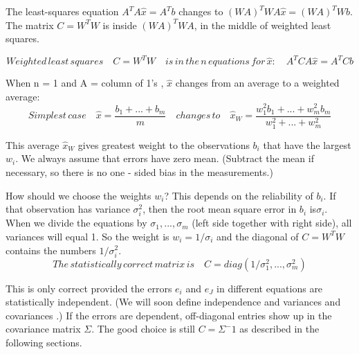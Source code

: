 	The least-squares equation $A^TA\hat{x}=A^Tb$ changes to $(WA)^TWA\hat{x}=(WA)^TWb$.
	The matrix $C=W^TW$ is inside $(WA)^TWA$, in the middle of weighted least squares.
	
	\begin{equation}
	Weighted \,least \,squares\quad 
	C=W^TW \quad is \,in \,the\, n\, equations\, for\, \hat{x}:   \quad A^TCA\hat{x}=A^TCb
	\end{equation}
	
	When n = 1 and A = column of 1's , $\hat{x}$ changes from an average to a weighted average: 
	\begin{equation}
	Simplest \,case 
	\quad \hat{x}=\frac{b_1+...+b_m}{m}
	\quad changes\,to 
	\quad \hat{x}_W=\frac{w^2_1b_1+...+w^2_mb_m}{w^2_1+...+w^2_m}
	\end{equation} 
	
	This average $\hat{x}_W$ gives greatest weight to the observations $b_i$ that have the largest $w_i$. We always assume that errors have zero mean. (Subtract the mean if necessary, so there is no one - sided bias in the measurements.)
	 
	How should we choose the weights $w_i$? This depends on the reliability of $b_i$. If that
	observation has variance $\sigma^2_i$, then the root mean square error in $b_i$ is$\sigma_i$. When we divide the equations by $\sigma_1,...,\sigma_m$ (left side together with right side), all variances will equal 1. So the weight is $w_i=1/\sigma_i$ and the diagonal of $C=W^TW$ contains the numbers $1/\sigma^2_i$.
	\begin{equation*}
	The\, statistically\, correct\, matrix\, is\quad  C=diag(1/\sigma^2_1,...,\sigma^2_m)
	\end{equation*}
	
	This is only correct provided the errors $e_i$ and $e_J$ in different equations are statistically independent. (We will soon define independence and variances and covariances .) If the errors are dependent, off-diagonal entries show up in the covariance matrix $\Sigma$. The good choice is still $C=\Sigma^-1$ as described in the following sections.
	 
	
	
	
	
	
	